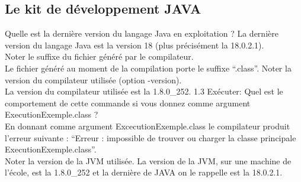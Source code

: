 \documentclass{article}
\begin{document}
\subsection{Le kit de développement JAVA}
Quelle est la dernière version du langage Java en exploitation ?
La dernière version du langage Java est la version 18 (plus précisément la 18.0.2.1).\\
Noter le suffixe du fichier généré par le compilateur.\\
Le fichier généré au moment de la compilation porte le suffixe “.class”.
Noter la version du compilateur utilisée (option -version).\\
La version du compilateur utilisée est la 1.8.0\_252.
1.3 Exécuter:
Quel est le comportement de cette commande si vous donnez comme argument
ExecutionExemple.class ?\\
En donnant comme argument ExcecutionExemple.class le compilateur produit l’erreur
suivante : “Erreur : impossible de trouver ou charger la classe principale
ExecutionExemple.class”.\\
Noter la version de la JVM utilisée.
La version de la JVM, sur une machine de l’école, est la 1.8.0\_252 et la dernière de JAVA on le rappelle est la 18.0.2.1.
\end{document}
